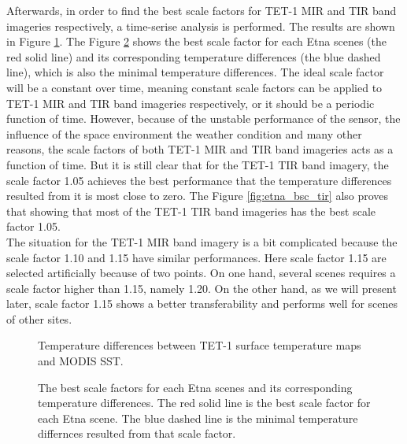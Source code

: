\noindent Afterwards, in order to find the best scale factors for TET-1 MIR and TIR band imageries respectively, a time-serise analysis is performed. The results are shown in Figure \ref{fig:etna_sc_mir_tir}. The Figure \ref{fig:etna_bsc_tem} shows the best scale factor for each Etna scenes (the red solid line) and its corresponding temperature differences (the blue dashed line), which is also the minimal temperature differences. The ideal scale factor will be a constant over time, meaning constant scale factors can be applied to TET-1 MIR and TIR band imageries respectively, or it should be a periodic function of time. However, because of the unstable performance of the sensor, the influence of the space environment the weather condition and many other reasons, the scale factors of both TET-1 MIR and TIR band imageries acts as a function of time. But it is still clear that for the TET-1 TIR band imagery, the scale factor 1.05 achieves the best performance that the temperature differences resulted from it is most close to zero. The Figure \ref{fig:etna_bsc_tir} also proves that showing that most of the TET-1 TIR band imageries has the best scale factor 1.05.\\

\noindent The situation for the TET-1 MIR band imagery is a bit complicated because the scale factor 1.10 and 1.15 have similar performances. Here scale factor 1.15 are selected artificially because of two points. On one hand, several scenes requires a scale factor higher than 1.15, namely 1.20. On the other hand, as we will present later, scale factor 1.15 shows a better transferability and performs well for scenes of other sites.\\

\begin{figure}[!htbp]
\centering
{}
\hspace{0.5in}
\caption{Temperature differences between TET-1 surface temperature maps and MODIS SST.}
\label{fig:etna_sc_mir_tir}
\end{figure}

\begin{figure}[!htbp]
\centering
{}
\hspace{0.5in}
\caption{The best scale factors for each Etna scenes and its corresponding temperature differences. The red solid line is the best scale factor for each Etna scene. The blue dashed line is the minimal temperature differnces resulted from that scale factor.}
\label{fig:etna_bsc_tem}
\end{figure}

